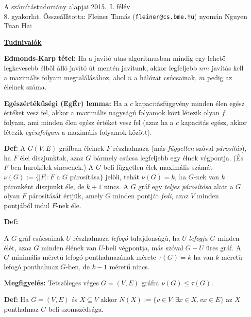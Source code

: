 \documentclass[a4paper, 12pt]{article}
\newcommand{\defi}{{\bf Def:} }
\newcommand{\megf}{{\bf Megfigyelés:} }
\begin{document}
\begin{center}
{\huge A számítástudomány alapjai 2015.\ I. félév}\\ 
{\large 8. gyakorlat.
\"Ossze\'all\'\i totta: Fleiner Tam\'as ({\tt fleiner@cs.bme.hu}) nyomán Nguyen Tuan Hai}
\end{center}

\noindent
{\bf\large\underline{Tudnivalók}}

{\bf Edmonds-Karp tétel:} Ha a javító utas algoritmusban mindig egy lehető
legkevesebb élből álló javító út mentén javítunk, akkor legfeljebb $nm$
javítás kell a maximális folyam megtalálásához, ahol $n$ a hálózat
csúcsainak, $m$ pedig az éleinek száma.


{\bf Egészértékűségi (EgÉr) lemma:} Ha a $c$ kapacitásfüggvény minden élen
egész értéket vesz fel, akkor a maximális nagyságú folyamok közt létezik
olyan $f$ folyam, ami minden élen egész értéket vesz fel (azaz ha a $c$
kapacitás egész, akkor létezik \emph{egészfolyam} a maximális folyamok
között).


\defi A $G(V,E)$ gráfban éleinek $F$ részhalmaza (más \emph{független}
szóval \emph{párosítás}), ha $F$ élei diszjunktak, azaz $G$ bármely csúcsa
legfeljebb egy élnek végpontja. (És $F$-ben hurokélek sincsenek.) A
$G$-beli független élek maximális számát $\nu(G):=\{|F|:F$ a $G$
párosítása$\}$ jelöli, tehát $\nu(G)=k$, ha $G$-nek van $k$ páronként
diszjunkt éle, de $k+1$ nincs. A $G$ gráf egy \emph{teljes párosítása} alatt a
$G$ olyan $F$ párosítását értjük, amely $G$ minden pontját \emph{fedi}, azaz
$V$ minden pontjából indul $F$-nek éle.

\defi 
\iffalse
A $G$ gráf csúcsainak $U$ részhalmaza \emph{független} ha $U$ nem feszít
élt, azaz $U$-nak semelyik két csúcsa sem szomszédos egymással. A
legnagyobb független ponthalmaz méretét $\alpha(G)$ jelöli, azaz
$\alpha(G)=k$, ha van $G$-nek $k$ páronként nem szomszédos pontja, de $k+1$
nincs.\\
Ugyanez az $U$ ponthalmaz 
\fi
A $G$ gráf csúcsainak $U$ részhalmaza \emph{lefogó} tulajdonságú, ha
$U$ \emph{lefogja} $G$ minden élét, azaz $G$ minden élének van $U$-beli
végpontja, más szóval $G-U$ üres gráf. A $G$ minimális méretű lefogó
ponthalmazának mérete $\tau(G)=k$ ha van $k$ méretű lefogó ponthalmaz
$G$-ben, de $k-1$ méretű nincs.

\megf  Tetszőleges véges $G=(V,E)$ gráfra 
$\nu(G)\le \tau(G)$. 

\defi Ha $G=(V,E)$ és  $X\subseteq V$ akkor $N(X):=\{v\in V:
\exists x\in X, vx\in E\}$ az $X$ ponthalmaz $G$-beli szomszédsága.
\end{document}
